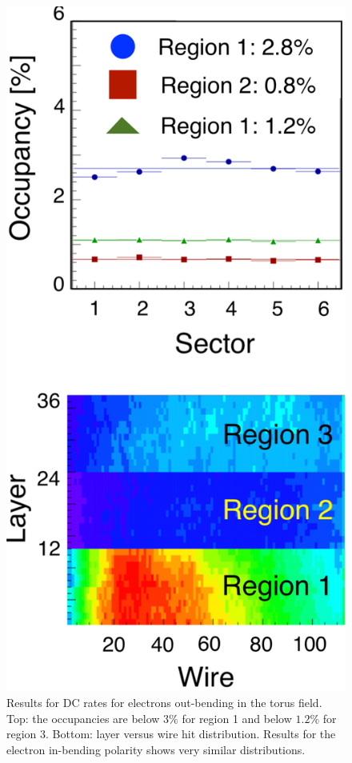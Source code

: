 \begin{figure}
	\centering
	\includegraphics[width=0.99\columnwidth,keepaspectratio]{img/dcOccupancy.png}
	\caption{Results for DC rates for electrons out-bending in the torus field.
		     Top: the occupancies are below $3\%$ for region 1 and below $1.2\%$ for region 3. Bottom: layer
		     versus wire hit distribution. Results for the electron in-bending polarity shows very similar distributions.}
	\label{fig:dcOccupancy}
\end{figure}

